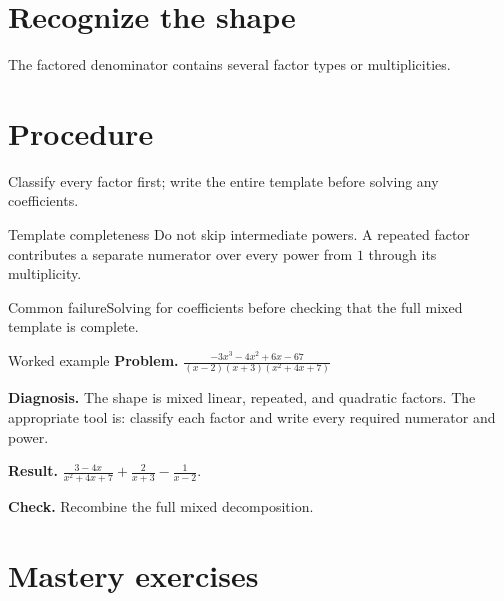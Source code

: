 \documentclass[11pt,oneside]{book}
\begin{document}
\section{Recognize the shape}
The factored denominator contains several factor types or multiplicities.
\section{Procedure}
Classify every factor first; write the entire template before solving any coefficients.

\begin{warningbox}{Template completeness}
Do not skip intermediate powers. A repeated factor contributes a separate numerator over every power from $1$ through its multiplicity.
\end{warningbox}
\begin{warningbox}{Common failure}Solving for coefficients before checking that the full mixed template is complete.\end{warningbox}
\begin{examplebox}{Worked example}
\textbf{Problem.} $\displaystyle \frac{- 3 x^{3} - 4 x^{2} + 6 x - 67}{\left(x - 2\right) \left(x + 3\right) \left(x^{2} + 4 x + 7\right)}$

\textbf{Diagnosis.} The shape is mixed linear, repeated, and quadratic factors. The appropriate tool is: classify each factor and write every required numerator and power.

\textbf{Result.} $\displaystyle \frac{3 - 4 x}{x^{2} + 4 x + 7} + \frac{2}{x + 3} - \frac{1}{x - 2}$.

\textbf{Check.} Recombine the full mixed decomposition.
\end{examplebox}
\section{Mastery exercises}
\end{document}
